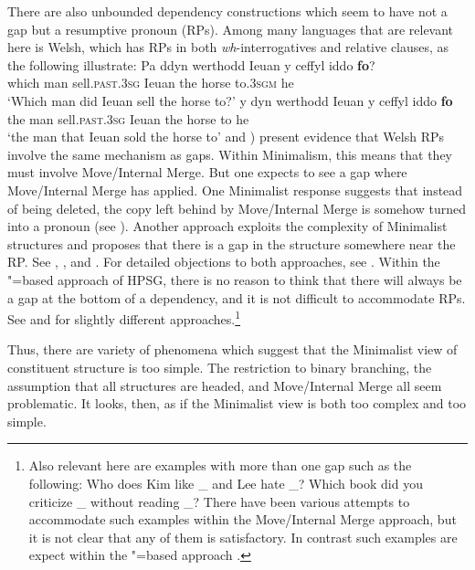 \documentclass[output=paper]{langsci/langscibook}
\begin{document}
There are also unbounded dependency constructions which seem to have not a gap but a resumptive pronoun (RPs). Among many languages that are relevant here is Welsh, which has RPs in both \textit{wh}-interrogatives and relative clauses, as the following illustrate:
\eal
\ex
\gll Pa	ddyn werthodd Ieuan y ceffyl iddo \textbf{fo}?\\
which man sell.\textsc{past}.\textsc{3sg} Ieuan the horse to.\textsc{3sgm} he\\
\glt`Which man did Ieuan sell the horse to?'
\ex 
\gll y dyn werthodd Ieuan y ceffyl iddo \textbf{fo}\\
the man sell.\textsc{past}.\textsc{3sg} Ieuan the horse to he\\
\glt`the man that Ieuan sold the horse to'
\zl
\citet{Willis.2011} and \citet{Borsley.2010,Borsley2013a-u}) present evidence that Welsh RPs involve
the same mechanism as gaps. Within Minimalism, this means that they must involve Move/Internal
Merge. But one expects to see a gap where Move/Internal Merge has applied. One Minimalist response
suggests that instead of being deleted, the copy left behind by Move/Internal Merge is somehow
turned into a pronoun (see \citealt{McCloskey.2006}). Another approach exploits the complexity of
Minimalist structures and proposes that there is a gap in the structure somewhere near the RP. See
\citet{Willis.2011}, \citet{AounChoueiriHornstein2001a-u}, and \citet{Boeckx.2003}. For detailed
objections to both approaches, see \citet[Section~3]{Borsley2013a-u}. Within the \slasch"=based approach of HPSG, there is no reason to think that there will always be a gap at the bottom of a dependency, and it is not difficult to accommodate RPs. See \citet{Borsley2013a-u} and \citet{crysmann_b10fg,Crysmann.2016} for slightly different approaches.\footnote{%
	Also relevant here are examples with more than one gap such as the following:
	\eal
	\ex	Who does Kim like \_ and Lee hate \_?
	\ex	Which book did you criticize \_ without reading \_?
	\zl
	There have been various attempts to accommodate such examples within the Move/Internal Merge approach, but it is not clear that any of them is satisfactory. In contrast such examples are expect within the \slasch"=based approach \citet{LS2003a-u}.%
}

Thus, there are variety of phenomena which suggest that the Minimalist view of constituent structure is too simple. The restriction to binary branching, the assumption that all structures are headed, and Move/Internal Merge all seem problematic. It looks, then, as if the Minimalist view is both too complex and too simple.
\end{document}
